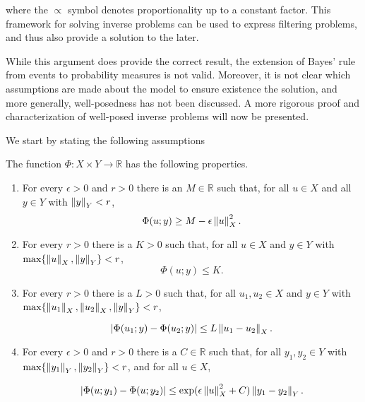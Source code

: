 where the $\propto$ symbol denotes proportionality up to a constant factor. This framework for solving inverse problems can be used to express filtering problems, and thus also provide a solution to the later. 


While this argument does provide the correct result, the extension of Bayes' rule from events to probability measures is not valid. Moreover, it is not clear which assumptions are made about the model to ensure existence  the solution, and more generally, well-posedness has not been discussed. A more rigorous proof and characterization of well-posed inverse problems will now be presented.

We start by stating the following assumptions

\begin{assumption}\label{assumption-ll}
  The function $\Phi : X \times Y \rightarrow \mathbb{R}$ has the following properties.
  
  \begin{enumerate}
  \item For every $\epsilon > 0$ and $r > 0$ there is an $M \in \mathbb{R}$ such that, for all $u \in X$ and all $y \in Y$ with $\left\lVert y\right\rVert_Y < r$,
    \begin{equation*}
      \Phi(u; y) \ge M - \epsilon\left\lVert u\right\rVert_X^2.
    \end{equation*}
  \item For every $r > 0$ there is a $K > 0$ such that, for all $u \in X$ and $y \in Y$ with $\text{max}\{\left\lVert u\right\rVert_X, \left\lVert y\right\rVert_Y\} < r$,
    \begin{equation*}
      \Phi(u; y) \le K.
    \end{equation*}

  \item For every $r > 0$ there is a $L > 0$ such that, for all $u_1, u_2 \in X$ and $y \in Y$ with $\text{max}\{\left\lVert u_1\right\rVert_X, \left\lVert u_2\right\rVert_X, \left\lVert y\right\rVert_Y\} < r$,

    \begin{equation*}
      |\Phi(u_1; y) - \Phi(u_2; y)| \le L\left\lVert u_1 - u_2\right\rVert_X.
    \end{equation*}

  \item For every $\epsilon > 0$ and $r > 0$ there is a $C \in \mathbb{R}$ such that, for all $y_1, y_2 \in Y$ with $\text{max}\{\left\lVert y_1\right\rVert_Y, \left\lVert y_2\right\rVert_Y\} < r$, and for all $u \in X$,

    \begin{equation*}
      |\Phi(u; y_1) - \Phi(u; y_2)| \le \exp(\epsilon\left\lVert u\right\rVert_X^2 + C)\left\lVert y_1 - y_2\right\rVert_Y.
    \end{equation*}
  \end{enumerate}
\end{assumption}

